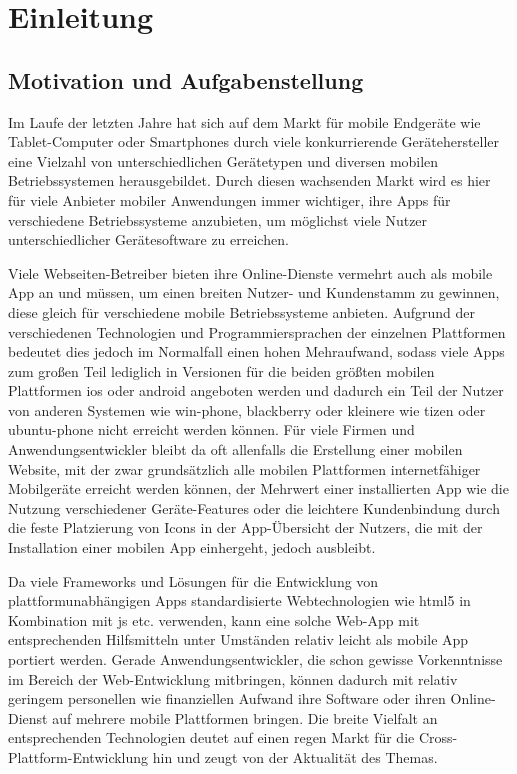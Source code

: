 
\chapter{Einleitung} \label{sec:einleitung}

\section{Motivation und Aufgabenstellung}

Im Laufe der letzten Jahre hat sich auf dem Markt für mobile Endgeräte wie Tablet-Computer oder Smartphones durch viele konkurrierende Gerätehersteller eine Vielzahl von unterschiedlichen Gerätetypen und diversen mobilen Betriebssystemen herausgebildet.
Durch diesen wachsenden Markt wird es hier für viele Anbieter mobiler Anwendungen immer wichtiger, ihre \mbox{Apps} für verschiedene Betriebssysteme anzubieten, um möglichst viele Nutzer unterschiedlicher Gerätesoftware zu erreichen. %

Viele Webseiten-Betreiber bieten ihre Online-Dienste vermehrt auch als mobile App an und müssen, um einen breiten Nutzer- und Kundenstamm zu gewinnen, diese gleich für verschiedene mobile Betriebssysteme anbieten.
Aufgrund der verschiedenen Technologien und Programmiersprachen der einzelnen Plattformen bedeutet dies jedoch im Normalfall einen hohen Mehraufwand, sodass viele Apps zum großen Teil lediglich in Versionen für die beiden größten mobilen Plattformen \gls{ios} oder \gls{android} angeboten werden und dadurch ein Teil der Nutzer von anderen Systemen wie \gls{win-phone}, \gls{blackberry} oder kleinere wie \gls{tizen} oder \gls{ubuntu-phone} nicht erreicht werden können. 
Für viele Firmen und Anwendungsentwickler bleibt da oft allenfalls die Erstellung einer mobilen Website, mit der zwar grundsätzlich alle mobilen Plattformen internetfähiger Mobilgeräte erreicht werden können, der Mehrwert einer installierten App wie die Nutzung verschiedener Geräte-Features oder die leichtere Kundenbindung durch die feste Platzierung von Icons in der App-Übersicht der Nutzers, die mit der Installation einer mobilen App einhergeht, jedoch ausbleibt.

Da viele Frameworks und Lösungen für die Entwicklung von plattformunabhängigen Apps standardisierte Webtechnologien wie \gls{html5} in Kombination mit \gls{js} etc. verwenden, kann eine solche Web-App mit entsprechenden Hilfsmitteln unter Umständen relativ leicht als mobile App portiert werden. Gerade Anwendungsentwickler, die schon gewisse Vorkenntnisse im Bereich der Web-Entwicklung mitbringen, können dadurch mit relativ geringem personellen wie finanziellen Aufwand ihre Software oder ihren Online-Dienst auf mehrere mobile Plattformen bringen. 
Die breite Vielfalt an entsprechenden Technologien deutet auf einen regen Markt für die Cross-Plattform-Entwicklung hin und zeugt von der Aktualität des Themas.

